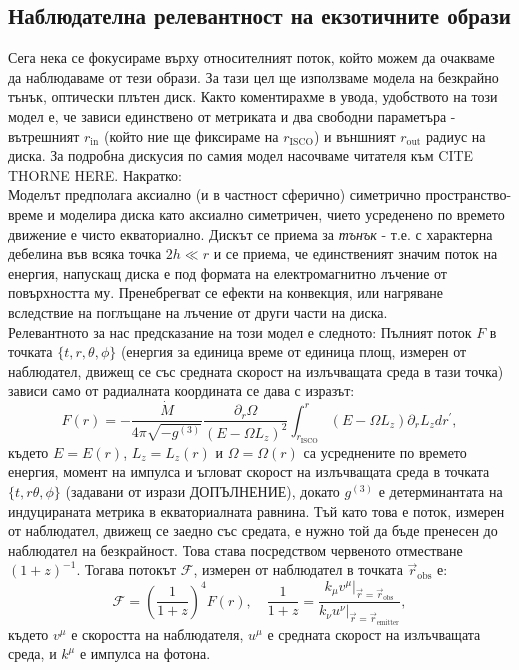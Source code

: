 \subsection{Наблюдателна релевантност на екзотичните образи}

Сега нека се фокусираме върху относителният поток, който можем да очакваме да наблюдаваме от тези образи. За тази цел ще използваме модела на безкрайно тънък, оптически плътен диск. Както коментирахме в увода, удобството на този модел е, че зависи единствено от метриката и два свободни параметъра - вътрешният $r_\text{in}$ (който ние ще фиксираме на $r_\text{ISCO}$) и външният $r_\text{out}$ радиус на диска. За подробна дискусия по самия модел насочваме читателя към CITE THORNE HERE. Накратко:\\

Моделът предполага аксиално (и в частност сферично) симетрично пространство-време и моделира диска като аксиално симетричен, чието усреденено по времето движение е чисто екваториално. Дискът се приема за \emph{тънък} - т.е. с характерна дебелина във всяка точка $2h \ll r$ и се приема, че единственият значим поток на енергия, напускащ диска е под формата на електромагнитно лъчение от повърхността му. Пренебрегват се ефекти на конвекция, или нагряване вследствие на поглъщане на лъчение от други части на диска.\\

Релевантното за нас предсказание на този модел е следното: Пълният поток $F$ в точката $\{t,r,\theta,\phi\}$ (енергия за единица време от единица площ, измерен от наблюдател, движещ се със средната скорост на излъчващата среда в тази точка) зависи само от радиалната координата се дава с изразът:
\begin{equation}
	F(r) = - \frac{\dot{M}}{4\pi\sqrt{-g^{(3)}}}\frac{\partial_r\Omega}{\left(E - \Omega L_z\right)^2}\int_{r_\text{ISCO}}^r \left(E - \Omega L_z\right)\partial_rL_zdr^\prime,
\end{equation}
където $E = E(r)$, $L_z = L_z(r)$ и $\Omega = \Omega(r)$ са усреднените по времето енергия, момент на импулса и ъгловат скорост на излъчващата среда в точката $\{t,r\theta,\phi\}$ (задавани от изрази ДОПЪЛНЕНИЕ), докато $g^{(3)}$ е детерминантата на индуцираната метрика в екваториалната равнина. Тъй като това е поток, измерен от наблюдател, движещ се заедно със средата, е нужно той да бъде пренесен до наблюдател на безкрайност. Това става посредством червеното отместване $(1 + z)^{-1}$. Тогава потокът $\mathcal{F}$, измерен от наблюдател в точката $\vec{r}_{\text{obs}}$ е:
\begin{equation}
	\mathcal{F} = \left(\frac{1}{1+z} \right)^4 F(r),\quad \frac{1}{1 + z} = \frac{k_\mu v^\mu\vert_{\vec{r} = \vec{r}_\text{obs}}}{k_\nu u^\nu\vert_{\vec{r} = \vec{r}_\text{emitter}}},
\end{equation}
където $v^\mu$ е скоростта на наблюдателя, $u^\mu$ е средната скорост на излъчващата среда, и $k^\mu$ е импулса на фотона.\\


